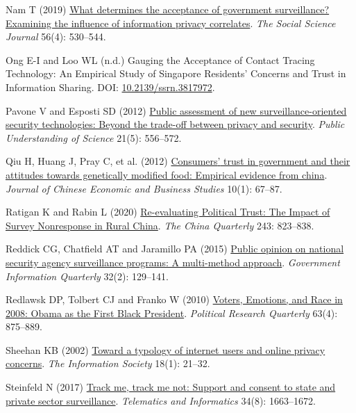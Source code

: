 \documentclass[
  letterpaper,
  DIV=11,
  numbers=noendperiod]{scrartcl}
\newlength{\cslhangindent}
\newenvironment{CSLReferences}[2] %
 {\begin{list}{}{%
  \setlength{\itemindent}{0pt}
  \setlength{\leftmargin}{0pt}
  \setlength{\parsep}{0pt}
  \ifodd #1
   \setlength{\leftmargin}{\cslhangindent}
   \setlength{\itemindent}{-1\cslhangindent}
  \fi
  \setlength{\itemsep}{#2\baselineskip}}}
 {\end{list}}
\begin{document}
\begin{CSLReferences}{1}{1}
Nam T (2019) \href{https://doi.org/10.1016/j.soscij.2018.10.001}{What
determines the acceptance of government surveillance? Examining the
influence of information privacy correlates}. \emph{The Social Science
Journal} 56(4): 530--544.

Ong E-I and Loo WL (n.d.) Gauging the Acceptance of Contact Tracing
Technology: An Empirical Study of Singapore Residents' Concerns and
Trust in Information Sharing. DOI:
\href{https://doi.org/10.2139/ssrn.3817972}{10.2139/ssrn.3817972}.

Pavone V and Esposti SD (2012)
\href{https://doi.org/10.1177/0963662510376886}{Public assessment of new
surveillance-oriented security technologies: Beyond the trade-off
between privacy and security}. \emph{Public Understanding of Science}
21(5): 556--572.

Qiu H, Huang J, Pray C, et al. (2012)
\href{https://doi.org/10.1080/14765284.2012.638471}{Consumers{'} trust
in government and their attitudes towards genetically modified food:
Empirical evidence from china}. \emph{Journal of Chinese Economic and
Business Studies} 10(1): 67--87.

Ratigan K and Rabin L (2020)
\href{https://doi.org/10.1017/S0305741019001231}{Re-evaluating Political
Trust: The Impact of Survey Nonresponse in Rural China}. \emph{The China
Quarterly} 243: 823--838.

Reddick CG, Chatfield AT and Jaramillo PA (2015)
\href{https://doi.org/10.1016/j.giq.2015.01.003}{Public opinion on
national security agency surveillance programs: A multi-method
approach}. \emph{Government Information Quarterly} 32(2): 129--141.

Redlawsk DP, Tolbert CJ and Franko W (2010)
\href{https://doi.org/10.1177/1065912910373554}{Voters, Emotions, and
Race in 2008: Obama as the First Black President}. \emph{Political
Research Quarterly} 63(4): 875--889.

Sheehan KB (2002)
\href{https://doi.org/10.1080/01972240252818207}{Toward a typology of
internet users and online privacy concerns}. \emph{The Information
Society} 18(1): 21--32.

Steinfeld N (2017)
\href{https://doi.org/10.1016/j.tele.2017.07.012}{Track me, track me
not: Support and consent to state and private sector surveillance}.
\emph{Telematics and Informatics} 34(8): 1663--1672.


\end{CSLReferences}
\end{document}

